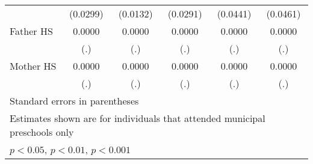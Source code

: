 \begin{table}[htbp]
\begin{tabular}{l*{5}{c}}
            &    (0.0299)         &    (0.0132)         &    (0.0291)         &    (0.0441)         &    (0.0461)         \\
\addlinespace
Father HS   &      0.0000         &      0.0000         &      0.0000         &      0.0000         &      0.0000         \\
            &         (.)         &         (.)         &         (.)         &         (.)         &         (.)         \\
\addlinespace
Mother HS   &      0.0000         &      0.0000         &      0.0000         &      0.0000         &      0.0000         \\
            &         (.)         &         (.)         &         (.)         &         (.)         &         (.)         \\
\bottomrule
\multicolumn{6}{l}{\footnotesize Standard errors in parentheses}\\
\multicolumn{6}{l}{\footnotesize Estimates shown are for individuals that attended municipal preschools only}\\
\multicolumn{6}{l}{\footnotesize \sym{*} \(p<0.05\), \sym{**} \(p<0.01\), \sym{***} \(p<0.001\)}\\
\end{tabular}
\end{table}
